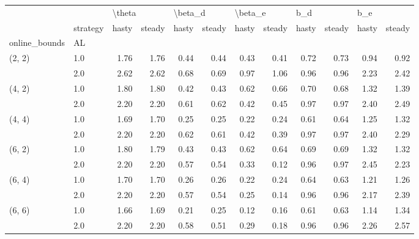 \begin{tabular}{llrrrrrrrrrr}
\toprule
       & {} & \multicolumn{2}{l}{\textbackslash theta} & \multicolumn{2}{l}{\textbackslash beta\_d} & \multicolumn{2}{l}{\textbackslash beta\_e} & \multicolumn{2}{l}{b\_d} & \multicolumn{2}{l}{b\_e} \\
       & strategy &  hasty & steady &   hasty & steady &   hasty & steady & hasty & steady & hasty & steady \\
online\_bounds & AL &        &        &         &        &         &        &       &        &       &        \\
\midrule
(2, 2) & 1.0 &   1.76 &   1.76 &    0.44 &   0.44 &    0.43 &   0.41 &  0.72 &   0.73 &  0.94 &   0.92 \\
       & 2.0 &   2.62 &   2.62 &    0.68 &   0.69 &    0.97 &   1.06 &  0.96 &   0.96 &  2.23 &   2.42 \\
(4, 2) & 1.0 &   1.80 &   1.80 &    0.42 &   0.43 &    0.62 &   0.66 &  0.70 &   0.68 &  1.32 &   1.39 \\
       & 2.0 &   2.20 &   2.20 &    0.61 &   0.62 &    0.42 &   0.45 &  0.97 &   0.97 &  2.40 &   2.49 \\
(4, 4) & 1.0 &   1.69 &   1.70 &    0.25 &   0.25 &    0.22 &   0.24 &  0.61 &   0.64 &  1.25 &   1.32 \\
       & 2.0 &   2.20 &   2.20 &    0.62 &   0.61 &    0.42 &   0.39 &  0.97 &   0.97 &  2.40 &   2.29 \\
(6, 2) & 1.0 &   1.80 &   1.79 &    0.43 &   0.43 &    0.62 &   0.64 &  0.69 &   0.69 &  1.32 &   1.32 \\
       & 2.0 &   2.20 &   2.20 &    0.57 &   0.54 &    0.33 &   0.12 &  0.96 &   0.97 &  2.45 &   2.23 \\
(6, 4) & 1.0 &   1.70 &   1.70 &    0.26 &   0.26 &    0.22 &   0.24 &  0.64 &   0.63 &  1.21 &   1.26 \\
       & 2.0 &   2.20 &   2.20 &    0.57 &   0.54 &    0.25 &   0.14 &  0.96 &   0.96 &  2.17 &   2.39 \\
(6, 6) & 1.0 &   1.66 &   1.69 &    0.21 &   0.25 &    0.12 &   0.16 &  0.61 &   0.63 &  1.14 &   1.34 \\
       & 2.0 &   2.20 &   2.20 &    0.58 &   0.51 &    0.29 &   0.18 &  0.96 &   0.96 &  2.26 &   2.57 \\
\bottomrule
\end{tabular}

